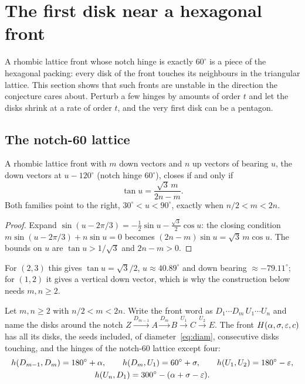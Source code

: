 \section{The first disk near a hexagonal front}\label{sec:static}

A rhombic lattice front whose notch hinge is exactly $60^\circ$ is a piece of the hexagonal packing:
every disk of the front touches its neighbours in the triangular lattice. This section shows that such
fronts are unstable in the direction the conjecture cares about. Perturb a few hinges by amounts of
order $t$ and let the disks shrink at a rate of order $t$, and the very first disk can be a pentagon.

\subsection{The notch-60 lattice}
\begin{lemma}\label{lem:notch60}
A rhombic lattice front with $m$ down vectors and $n$ up vectors of bearing $u$, the down vectors at
$u-120^\circ$ (notch hinge $60^\circ$), closes if and only if
\[
\tan u=\frac{\sqrt3\,m}{2n-m}.
\]
Both families point to the right, $30^\circ<u<90^\circ$, exactly when $n/2<m<2n$.
\end{lemma}

\begin{proof}
Expand $\sin(u-2\pi/3)=-\tfrac12\sin u-\tfrac{\sqrt3}2\cos u$: the closing condition
$m\sin(u-2\pi/3)+n\sin u=0$ becomes $(2n-m)\sin u=\sqrt3\,m\cos u$. The bounds on $u$ are $\tan u>1/\sqrt3$
and $2n-m>0$.
\end{proof}

\noindent For $(2,3)$ this gives $\tan u=\sqrt3/2$, $u\approx40.89^\circ$ and down bearing
$\approx-79.11^\circ$; for $(1,2)$ it gives a vertical down vector, which is why the construction below
needs $m,n\ge2$.

\begin{definition}\label{def:hexfront}
Let $m,n\ge2$ with $n/2<m<2n$. Write the front word as $D_1\cdots D_m\,U_1\cdots U_n$ and name the disks
around the notch $Z\xrightarrow{D_{m-1}}A\xrightarrow{D_m}B\xrightarrow{U_1}C\xrightarrow{U_2}E$. The front
$H(\alpha,\sigma,\varepsilon,c)$ has all its disks, the seeds included, of diameter~\eqref{eq:diam}, consecutive disks
touching, and the hinges of the notch-60 lattice except four:
\begin{gather*}
h(D_{m-1},D_m)=180^\circ+\alpha,\qquad h(D_m,U_1)=60^\circ+\sigma,\qquad h(U_1,U_2)=180^\circ-\varepsilon,\\
h(U_n,D_1)=300^\circ-(\alpha+\sigma-\varepsilon).
\end{gather*}
\end{definition}

